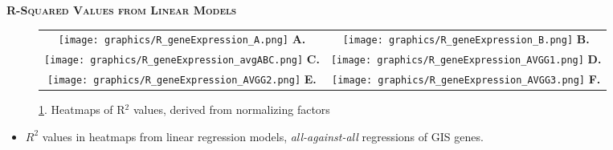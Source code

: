 \documentclass[final,t]{beamer}
\begin{document}
\begin{frame}{}
\begin{columns}
\begin{column}{.5\linewidth}
%
%

		\begin{block}{\textsc{\textbf{R-Squared Values from Linear Models}}}
			\vspace*{3mm}
			\begin{figure}
				\begin{tabular}{cc}
					\hspace*{5mm}

					\texttt{[image: graphics/R\_geneExpression\_A.png]}
					\textbf{A.}
					&                     
					\texttt{[image: graphics/R\_geneExpression\_B.png]}
					\textbf{B.}\\

					\texttt{[image: graphics/R\_geneExpression\_avgABC.png]}
					\textbf{C.}
					&                      
					\texttt{[image: graphics/R\_geneExpression\_AVGG1.png]}
					\textbf{D.}\\

					\texttt{[image: graphics/R\_geneExpression\_AVGG2.png]}
					\textbf{E.}
					&                      
					\texttt{[image: graphics/R\_geneExpression\_AVGG3.png]}
					\textbf{F.}\\
				\end{tabular}				
				\caption{\ref{tab:ge}. Heatmaps of R$^{2}$ values, derived from normalizing factors}
				\label{tab:ge}
			\end{figure}
			\begin{itemize}
				\item $R^{2}$ values in heatmaps from linear regression models, \emph{all-against-all} regressions of GIS genes.


\end{itemize}
\end{block}
\end{column}
\end{columns}
\end{frame}
\end{document}

